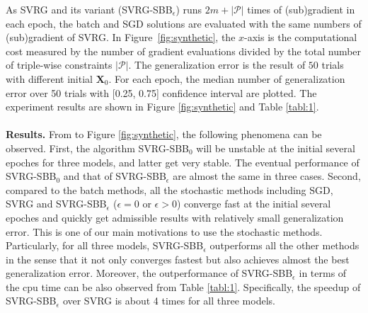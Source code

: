 \documentclass[letterpaper]{article} %
\begin{document}
As SVRG and its variant (SVRG-SBB$_\epsilon$) runs $2m+|\mathcal{P}|$ times of (sub)gradient in each epoch, the batch and SGD solutions are evaluated with the same numbers of (sub)gradient of SVRG. In Figure~\ref{fig:synthetic}, the $x$-axis is the computational cost measured by the number of gradient evaluations divided by the total number of triple-wise constraints $|\mathcal{P}|$. The generalization error is the result of $50$ trials with different initial $\mathbf{X}_0$. For each epoch, the median number of generalization error over 50 trials with [0.25, 0.75] confidence interval are plotted. The experiment results are shown in Figure \ref{fig:synthetic} and Table \ref{tabl:1}.
\\\\
\textbf{Results.}
From to Figure \ref{fig:synthetic}, the following phenomena can be observed.
First, the algorithm SVRG-SBB$_0$ will be unstable at the initial several epoches for three models, and latter get very stable. The eventual performance of SVRG-SBB$_0$ and that of SVRG-SBB$_\epsilon$ are almost the same in three cases.
Second, compared to the batch methods, all the stochastic methods including SGD, SVRG and SVRG-SBB$_{\epsilon}$ ($\epsilon =0$ or $\epsilon>0$) converge fast at the initial several epoches and quickly get admissible results with relatively small generalization error. This is one of our main motivations to use the stochastic methods. Particularly, for all three models, SVRG-SBB$_\epsilon$ outperforms all the other methods in the sense that it not only converges fastest but also achieves almost the best generalization error. Moreover, the outperformance of SVRG-SBB$_\epsilon$ in terms of the cpu time can be also observed from Table \ref{tabl:1}. Specifically, the speedup of SVRG-SBB$_\epsilon$ over SVRG is about 4 times for all three models.


\end{document}
